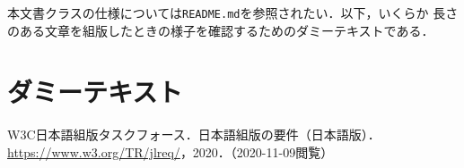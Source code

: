 \documentclass[
  platex, dvipdfmx,  %
]{nlp2021}
\newcommand{\code}[1]{\texttt{#1}}
\begin{document}
本文書クラスの仕様については\code{README.md}を参照されたい．以下，いくらか
長さのある文章を組版したときの様子を確認するためのダミーテキストである．

\section{ダミーテキスト}



\begin{thebibliography}{9}
  W3C日本語組版タスクフォース．日本語組版の要件（日本語版）．
  \url{https://www.w3.org/TR/jlreq/}，2020．（2020-11-09閲覧）
\end{thebibliography}
\end{document}
